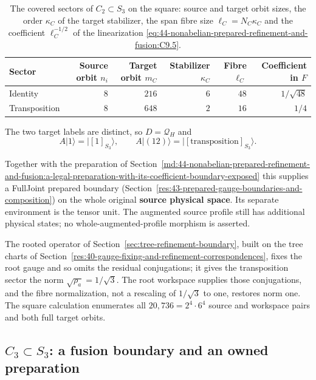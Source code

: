 \begin{table}[htbp]
\centering\small
\renewcommand{\arraystretch}{1.15}
\begin{tabular}{@{}lrrrrr@{}}
\toprule
Sector & Source orbit $n_i$ & Target orbit $m_C$ & Stabilizer $\kappa_C$
  & Fibre $\ell_C$ & Coefficient in $F$\\
\midrule
Identity & $8$ & $216$ & $6$ & $48$ & $1/\sqrt{48}$\\
Transposition & $8$ & $648$ & $2$ & $16$ & $1/4$\\
\bottomrule
\end{tabular}
\caption{The covered sectors of $C_2\subset S_3$ on the square: source and
target orbit sizes, the order $\kappa_C$ of the target stabilizer, the span
fibre size $\ell_C=N_C\kappa_C$ and the coefficient $\ell_C^{-1/2}$ of the
linearization \eqref{eq:44-nonabelian-prepared-refinement-and-fusion:C9.5}.}
\label{tab:c2s3-sectors}
\end{table}

The two target labels are distinct, so $D=\mathcal Q_H$ and
\begin{equation}
A|1\rangle=|[1]_{S_3}\rangle,\qquad
 A|(12)\rangle=|[\text{transposition}]_{S_3}\rangle.
 \label{eq:44-nonabelian-prepared-refinement-and-fusion:C9.12}
\end{equation}

Together with the preparation of
Section~\ref{md:44-nonabelian-prepared-refinement-and-fusion:a-legal-preparation-with-its-coefficient-boundary-exposed}
this supplies a FullJoint prepared boundary
(Section~\ref{res:43-prepared-gauge-boundaries-and-composition}) on the whole original
\textbf{source physical space}.  Its separate environment is the tensor unit.
The augmented source profile still has additional physical states; no
whole-augmented-profile morphism is asserted.

The rooted operator of Section~\ref{sec:tree-refinement-boundary}, built on the
tree charts of Section~\ref{res:40-gauge-fixing-and-refinement-correspondences},
fixes the root gauge and so omits the residual conjugations; it gives the
transposition sector the norm $\sqrt{\rho_a}=1/\sqrt3$.  The root workspace
supplies those conjugations, and the fibre normalization, not a rescaling of
$1/\sqrt3$ to one, restores norm one.  The square calculation enumerates all
$20{,}736=2^4\cdot6^4$ source and workspace pairs and both full target orbits.

\subsection{\texorpdfstring{$C_3\subset S_3$}{C3 in S3}: a fusion boundary and an owned preparation}\label{md:44-nonabelian-prepared-refinement-and-fusion:c3s3-a-genuine-fusion-boundary-and-an-owned-preparation}

